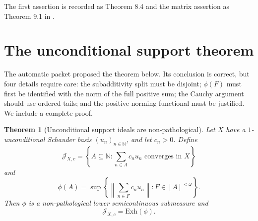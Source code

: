 \documentclass[11pt]{article}
\newtheorem{theorem}{Theorem}[section]
\theoremstyle{definition}
\theoremstyle{remark}
\newcommand{\N}{\mathbb N}
\newcommand{\J}{\mathcal J}
\newcommand{\Exh}{\mathrm{Exh}}
\begin{document}
The first assertion is recorded as Theorem 8.4 and the matrix assertion as
Theorem 9.1 in \cite{FilipowTryba}.

\section{The unconditional support theorem}

The automatic packet proposed the theorem below.  Its conclusion is correct,
but four details require care: the subadditivity split must be disjoint;
$\phi(F)$ must first be identified with the norm of the full positive sum; the
Cauchy argument should use ordered tails; and the positive norming functional
must be justified.  We include a complete proof.

\begin{theorem}[Unconditional support ideals are non-pathological]
\label{thm:unconditional-support}
Let $X$ have a $1$-unconditional Schauder basis $(u_n)_{n\in\N}$, and let
$c_n>0$.  Define
\[
 \J_{X,c}=\left\{A\subseteq\N:
                  \sum_{n\in A}c_nu_n\text{ converges in }X\right\}
\]
and
\begin{equation}\label{eq:phi-support}
 \phi(A)=\sup\left\{
   \left\|\sum_{n\in F}c_nu_n\right\|:F\in[A]^{<\omega}\right\}.
\end{equation}
Then $\phi$ is a non-pathological lower semicontinuous submeasure and
\[
 \J_{X,c}=\Exh(\phi).
\]
\end{theorem}
\end{document}
